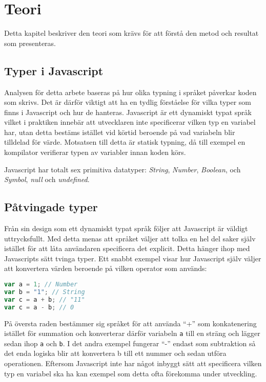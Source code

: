 \section{Teori}
\label{sec:alexander-theory}

Detta kapitel beskriver den teori som krävs för att förstå den metod och resultat som presenteras.

\subsection{Typer i Javascript}

Analysen för detta arbete baseras på hur olika typning i språket påverkar koden som skrivs. Det är därför viktigt att ha en tydlig förståelse för vilka typer som finns i Javascript och hur de hanteras. Javascript är ett dynamiskt typat språk vilket i praktiken innebär att utvecklaren inte specificerar vilken typ en variabel har, utan detta bestäms istället vid körtid beroende på vad variabeln blir tilldelad för värde. Motsatsen till detta är statisk typning, då till exempel en kompilator verifierar typen av variabler innan koden körs.

Javascript har totalt sex primitiva datatyper: \textit{String}, \textit{Number}, \textit{Boolean}, och \textit{Symbol}, \textit{null} och \textit{undefined}.\cite{javascript-primitives}

\subsection{Påtvingade typer}

Från sin design som ett dynamiskt typat språk följer att Javascript är väldigt uttrycksfullt.\cite{javascript-type-coersion} Med detta menas att språket väljer att tolka en hel del saker själv istället för att låta användaren specificera det explicit. Detta hänger ihop med Javascripts sätt tvinga typer. Ett snabbt exempel visar hur Javascript själv väljer att konvertera värden beroende på vilken operator som används:

\begin{lstlisting}[language=JavaScript]
var a = 1; // Number
var b = "1"; // String
var c = a + b; // "11"
var c = a - b; // 0
\end{lstlisting}




På översta raden bestämmer sig språket för att använda ``+'' som konkatenering istället för summation och konverterar därför variabeln \texttt{a} till en sträng och lägger sedan ihop \texttt{a} och \texttt{b}. I det andra exempel fungerar ``-'' endast som subtraktion så det enda logiska blir att konvertera b till ett nummer och sedan utföra operationen. Eftersom Javascript inte har något inbyggt sätt att specificera vilken typ en variabel ska ha kan exempel som detta ofta förekomma under utveckling.

